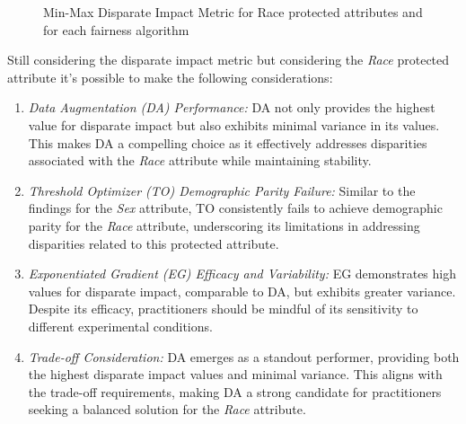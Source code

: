 \begin{figure}[H]
    \centering
    \caption{Min-Max Disparate Impact Metric for Race protected attributes and for each fairness algorithm}
\end{figure}

Still considering the disparate impact metric but considering the \emph{Race} protected attribute it's possible to make the following considerations:

\begin{enumerate}
    \item \emph{Data Augmentation (DA) Performance:} DA not only provides the highest value for disparate impact but also exhibits minimal variance in its values. This makes DA a compelling choice as it effectively addresses disparities associated with the \emph{Race} attribute while maintaining stability.

    \item \emph{Threshold Optimizer (TO) Demographic Parity Failure:} Similar to the findings for the \emph{Sex} attribute, TO consistently fails to achieve demographic parity for the \emph{Race} attribute, underscoring its limitations in addressing disparities related to this protected attribute.

    \item \emph{Exponentiated Gradient (EG) Efficacy and Variability:} EG demonstrates high values for disparate impact, comparable to DA, but exhibits greater variance. Despite its efficacy, practitioners should be mindful of its sensitivity to different experimental conditions.

    \item \emph{Trade-off Consideration:} DA emerges as a standout performer, providing both the highest disparate impact values and minimal variance. This aligns with the trade-off requirements, making DA a strong candidate for practitioners seeking a balanced solution for the \emph{Race} attribute.
\end{enumerate}

